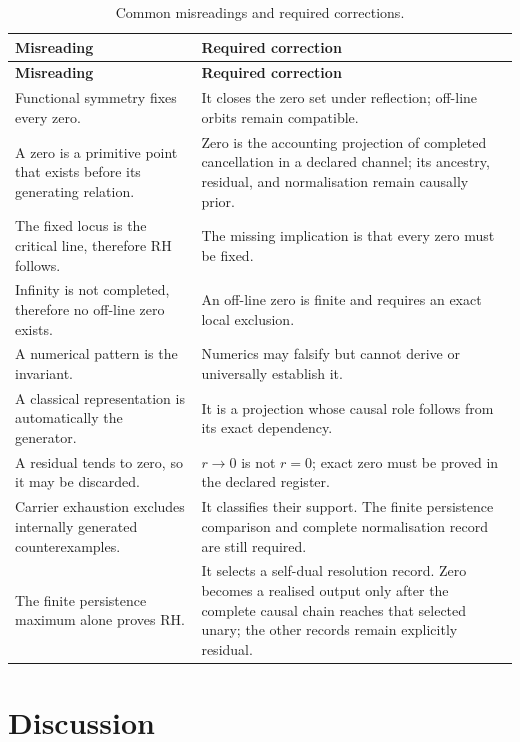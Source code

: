 \documentclass[11pt,a4paper]{article}
\theoremstyle{definition}
\begin{document}
\begin{longtable}{@{}p{}p{}@{}}
\caption{Common misreadings and required corrections.}
\label{tab:guardrails}\\
\toprule
\textbf{Misreading} & \textbf{Required correction} \\
\midrule
\endfirsthead
\toprule
\textbf{Misreading} & \textbf{Required correction} \\
\midrule
\endhead
Functional symmetry fixes every zero. &
It closes the zero set under reflection; off-line orbits remain compatible. \\
\addlinespace
A zero is a primitive point that exists before its generating relation. &
Zero is the accounting projection of completed cancellation in a declared
channel; its ancestry, residual, and normalisation remain causally prior. \\
\addlinespace
The fixed locus is the critical line, therefore RH follows. &
The missing implication is that every zero must be fixed. \\
\addlinespace
Infinity is not completed, therefore no off-line zero exists. &
An off-line zero is finite and requires an exact local exclusion. \\
\addlinespace
A numerical pattern is the invariant. &
Numerics may falsify but cannot derive or universally establish it. \\
\addlinespace
A classical representation is automatically the generator. &
It is a projection whose causal role follows from its exact dependency. \\
\addlinespace
A residual tends to zero, so it may be discarded. &
$r\to0$ is not $r=0$; exact zero must be proved in the declared register. \\
\addlinespace
Carrier exhaustion excludes internally generated counterexamples. &
It classifies their support. The finite persistence comparison and complete
normalisation record are still required. \\
\addlinespace
The finite persistence maximum alone proves RH. &
It selects a self-dual resolution record. Zero becomes a realised output only
after the complete causal chain reaches that selected unary; the other records
remain explicitly residual. \\
\bottomrule
\end{longtable}

\section{Discussion}
\label{sec:discussion}
\end{document}
